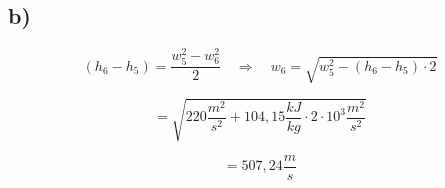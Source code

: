 

\subsection*{b)}

\[
(h_6 - h_5) = \frac{w_5^2 - w_6^2}{2} \quad \Rightarrow \quad w_6 = \sqrt{w_5^2 - (h_6 - h_5) \cdot 2}
\]

\[
= \sqrt{220 \frac{m^2}{s^2} + 104,15 \frac{kJ}{kg} \cdot 2 \cdot 10^3 \frac{m^2}{s^2}}
\]

\[
= 507,24 \frac{m}{s}
\]